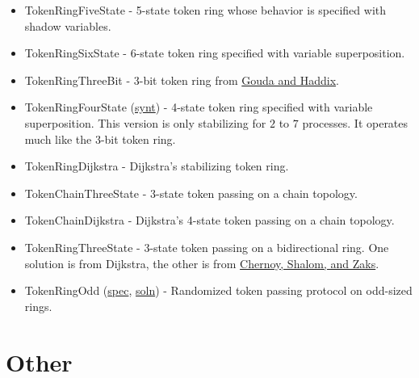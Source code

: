 \begin{itemize}
\item TokenRingFiveState \href{TokenPassing.html#sec:TokenRingFiveState}{\LinkText}
- 5-state token ring whose behavior is specified with shadow variables.
\item TokenRingSixState \href{TokenPassing.html#sec:TokenRingSixState}{\LinkText}
- 6-state token ring specified with variable superposition.
\item TokenRingThreeBit \href{TokenPassing.html#sec:TokenRingThreeBit}{\LinkText}
- 3-bit token ring from \href{http://dx.doi.org/10.1006/jpdc.1996.0066}{Gouda and Haddix}.
\item TokenRingFourState (\href{\examplesynt/TokenRingFourState.prot}{synt})
- 4-state token ring specified with variable superposition.
This version is only stabilizing for $2$ to $7$ processes.
It operates much like the 3-bit token ring.
\item TokenRingDijkstra \href{TokenPassing.html#sec:TokenRingDijkstra}{\LinkText}
- Dijkstra's stabilizing token ring.
\item TokenChainThreeState \href{TokenPassing.html#sec:TokenChainThreeState}{\LinkText}
- 3-state token passing on a chain topology.
\item TokenChainDijkstra \href{TokenPassing.html#sec:TokenChainDijkstra}{\LinkText}
- Dijkstra's 4-state token passing on a chain topology.
\item TokenRingThreeState \href{TokenPassing.html#sec:TokenRingThreeState}{\LinkText}
- 3-state token passing on a bidirectional ring.
One solution is from Dijkstra, the other is from \href{http://citeseerx.ist.psu.edu/viewdoc/summary?doi=10.1.1.153.6017}{Chernoy, Shalom, and Zaks}.
\item TokenRingOdd (\href{\examplespec/TokenRingOdd.prot}{spec}, \href{\examplesoln/TokenRingOdd.prot}{soln})
- Randomized token passing protocol on odd-sized rings.
\end{itemize}


\section{Other}

